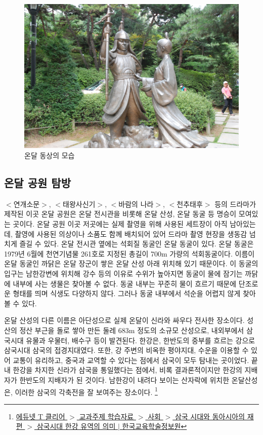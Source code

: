 \begin{figure}[ht]
    \centering
    \includegraphics[width=.6\textwidth]{s_img/온달_사진.jpg}
    \caption{온달 동상의 모습}
    \label{fig:my_label_s4}
 \end{figure}

\subsection{온달 공원 탐방}
$<$연개소문$>$, $<$태왕사신기$>$, $<$바람의 나라$>$, $<$천추태후$>$ 등의 드라마가 제작된 이곳 온달 공원은 
온달 전시관을 비롯해 온달 산성, 온달 동굴 등 명승이 모여있는 곳이다. 
온달 공원 이곳 저곳에는 실제 촬영을 위해 사용된 세트장이 아직 남아있는데, 촬영에 사용된 의상이나 소품도 함께 배치되어 있어 
드라마 촬영 현장을 생동감 넘치게 즐길 수 있다. 
온달 전시관 옆에는 석회질 동굴인 온달 동굴이 있다. 
온달 동굴은 1979년 6월에 천연기념물 261호로 지정된 총길이 700m 가량의 석회동굴이다. 
이름이 온달 동굴인 까닭은 온달 장군이 쌓은 온달 산성 아래 위치해 있기 때문이다. 
이 동굴의 입구는 남한강변에 위치해 강수 등의 이유로 수위가 높아지면 동굴이 물에 잠기는 까닭에 내부에 사는 생물은 찾아볼 수 없다. 
동굴 내부는 꾸준히 물이 흐르기 때문에 단조로운 형태를 띄며 식생도 다양하지 않다. 
그러나 동굴 내부에서 석순을 어렵지 않게 찾아볼 수 있다. 


온달 산성의 다른 이름은 아단성으로 실제 온달이 신라와 싸우다 전사한 장소이다. 
성산의 정산 부근을 돌로 쌓아 만든 둘레 683m 정도의 소규모 산성으로, 
내외부에서 삼국시대 유물과 우물터, 배수구 등이 발견된다. 
한강은, 한반도의 중부를 흐르는 강으로 삼국시대 삼국의 접경지대였다. 
또한, 강 주변의 비옥한 평야지대, 수운을 이용할 수 있어 교통이 유리하고, 중국과 교역할 수 있다는 점에서 삼국이 모두 탐내는 곳이었다.
끝내 한강을 차지한 신라가 삼국을 통일했다는 점에서, 비록 결과론적이지만
한강의 지배자가 한반도의 지배자가 된 것이다.
남한강이 내려다 보이는 산자락에 위치한 온달산성은, 
이러한 삼국의 각축전을 잘 보여주는 장소이다.
\footnote{\href{https://www.edunet.net/nedu/contsvc/viewWkstCont.do?clss_id=CLSS0000000362&menu_id=81&contents_id=1d7c0c64-bc0f-45e7-8f4d-82a7bb00cc97&svc_clss_id=CLSS0000072410&contents_openapi=naverdic}
{에듀넷 T 클리어 $>$ 교과주제 학습자료 $>$ 사회 $>$ 삼국 시대와 동아시아의 재편 $>$ 삼국시대 한강 유역의 의미 $|$ 한국교육학술정보원}}



